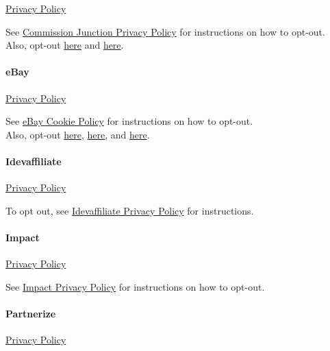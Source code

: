 \href{https://www.conversantmedia.com/legal/privacy}{Privacy Policy}

See \href{https://chartbeat.com/privacy/}{Commission Junction Privacy
Policy} for instructions on how to opt-out.\\
Also, opt-out \href{https://www.youronlinechoices.com/}{here} and
\href{http://www.aboutads.info/choices/}{here}.

\hypertarget{ebay}{%
\paragraph{eBay}\label{ebay}}

\href{https://partnernetwork.ebay.com/page/network-agreement\#privacy-notice}{Privacy
Policy}

See
\href{https://www.ebayinc.com/company/privacy-center/privacy-notice/cookies-similar-technologies/}{eBay
Cookie Policy} for instructions on how to opt-out.\\
Also, opt-out \href{https://www.youronlinechoices.com}{here},
\href{http://www.aboutads.info/choices/}{here}, and
\href{https://optout.networkadvertising.org/?c=1}{here}.

\hypertarget{idevaffiliate}{%
\paragraph{Idevaffiliate}\label{idevaffiliate}}

\href{https://www.idevdirect.com/policies.php}{Privacy Policy}

To opt out, see
\href{https://www.idevdirect.com/policies.php}{Idevaffiliate Privacy
Policy} for instructions.

\hypertarget{impact}{%
\paragraph{Impact}\label{impact}}

\href{https://impact.com/privacy-policy/}{Privacy Policy}

See \href{https://impact.com/privacy-policy/}{Impact Privacy Policy} for
instructions on how to opt-out.

\hypertarget{partnerize}{%
\paragraph{Partnerize}\label{partnerize}}

\href{https://partnerize.com/en/privacy-policy}{Privacy Policy}

